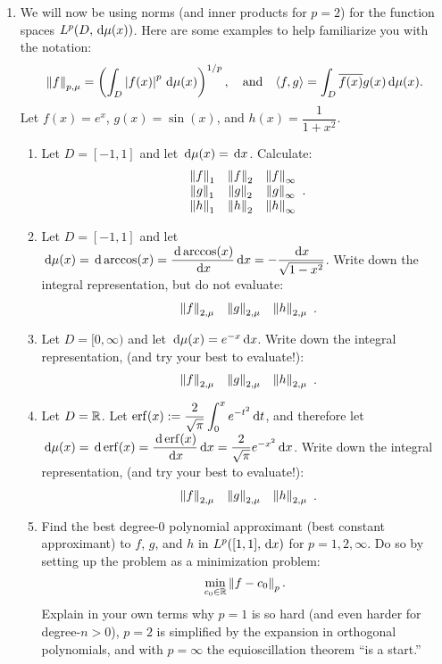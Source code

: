 \documentclass[11pt,letterpaper]{article}
\begin{document}
\begin{enumerate}
\item We will now be using norms (and inner products for $p=2$) for the function spaces $L^p(D,{\rm\,d}\mu(x))$. Here are some examples to help familiarize you with the notation:
\[
\left\|{f}\right\|_{p,\mu} = \left(\int_D \left|{f(x)}\right|^p{\rm\,d}\mu(x)\right)^{1/p},\quad{\rm and}\quad\langle f,g\rangle = \int_D \overline{f(x)}g(x){\rm\,d}\mu(x).
\]
 Let $f(x) = e^x$, $g(x) = \sin(x)$, and $h(x) = \dfrac{1}{1+x^2}$.
\begin{enumerate}
\item Let $D = [-1,1]$ and let ${\rm\,d}\mu(x) = {\rm\,d} x$. Calculate:
\[\begin{array}{ccc}
\left\|{f}\right\|_1 & \left\|{f}\right\|_2 & \left\|{f}\right\|_\infty\\
\left\|{g}\right\|_1 & \left\|{g}\right\|_2 & \left\|{g}\right\|_\infty\\
\left\|{h}\right\|_1 & \left\|{h}\right\|_2 & \left\|{h}\right\|_\infty\\
\end{array}.
\]
\item Let $D=[-1,1]$ and let ${\rm\,d}\mu(x) = {\rm\,d}\arccos(x) = \dfrac{{\rm\,d} \arccos(x)}{{\rm\,d} x}{\rm\,d} x = -\dfrac{{\rm\,d} x}{\sqrt{1-x^2}}$. Write down the integral representation, but do not evaluate:
\[
\begin{array}{ccc}
\left\|{f}\right\|_{2,\mu} & \left\|{g}\right\|_{2,\mu} & \left\|{h}\right\|_{2,\mu}\\
\end{array}.
\]
\item Let $D = [0,\infty)$ and let ${\rm\,d}\mu(x) = e^{-x}{\rm\,d} x$. Write down the integral representation, (and try your best to evaluate!):
\[
\begin{array}{ccc}
\left\|{f}\right\|_{2,\mu} & \left\|{g}\right\|_{2,\mu} & \left\|{h}\right\|_{2,\mu}\\
\end{array}.
\]
\item Let $D=\mathbb{R}$. Let $\displaystyle \operatorname{erf}(x) := \dfrac{2}{\sqrt{\pi}}\int_0^x e^{-t^2}{\rm\,d} t$, and therefore let ${\rm\,d}\mu(x) = {\rm\,d}\operatorname{erf}(x) = \dfrac{{\rm\,d} \operatorname{erf}(x)}{{\rm\,d} x}{\rm\,d} x = \dfrac{2}{\sqrt{\pi}}e^{-x^2}{\rm\,d} x$. Write down the integral representation, (and try your best to evaluate!):
\[
\begin{array}{ccc}
\left\|{f}\right\|_{2,\mu} & \left\|{g}\right\|_{2,\mu} & \left\|{h}\right\|_{2,\mu}\\
\end{array}.
\]
\item Find the best degree-$0$ polynomial approximant (best constant approximant) to $f$, $g$, and $h$ in $L^p([1,1],{\rm\,d} x)$ for $p=1,2,\infty$. Do so by setting up the problem as a minimization problem:
\[
\min_{c_0\in\mathbb{R}}\left\|{f-c_0}\right\|_p.
\]
Explain in your own terms why $p=1$ is so hard (and even harder for degree-$n>0$), $p=2$ is simplified by the expansion in orthogonal polynomials, and with $p=\infty$ the equioscillation theorem ``is a start.''
\end{enumerate}


\end{enumerate}
\end{document}
